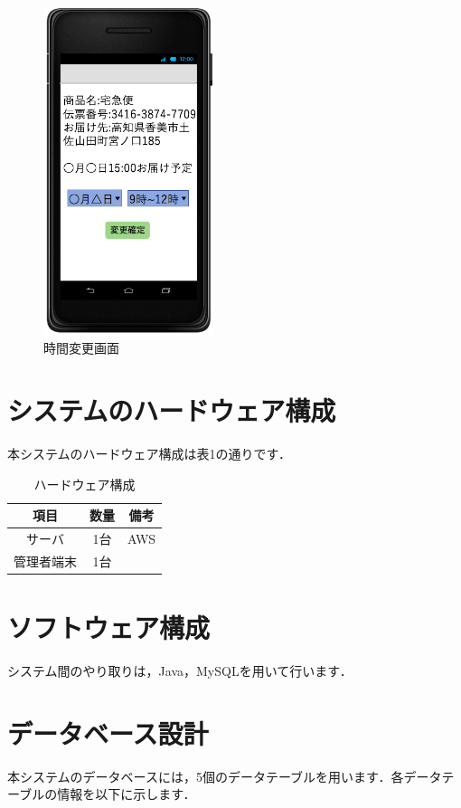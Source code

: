 \documentclass[a4j,titlepage]{jarticle}
\begin{document}
\begin{figure}[H]
 \begin{center}
  \includegraphics[width=50mm]{time_change.png}
	\caption{時間変更画面}
	\label{fig:time_change}
 \end{center}

\end{figure}
\newpage
\section{システムのハードウェア構成}
本システムのハードウェア構成は表1の通りです．
\begin{table}[H]
\begin{center}
 \caption{ハードウェア構成}
  \begin{tabular}{|c|c|c|}\hline
    項目 & 数量 & 備考\\ \hline \hline
    サーバ & 1台 & AWS\\ \hline
    管理者端末 & 1台 & \\ \hline
  \end{tabular}
\end{center}
\end{table}


\section{ソフトウェア構成}
システム間のやり取りは，Java，MySQLを用いて行います．

\section{データベース設計}
本システムのデータベースには，5個のデータテーブルを用います．各データテーブルの情報を以下に示します．
\end{document}
